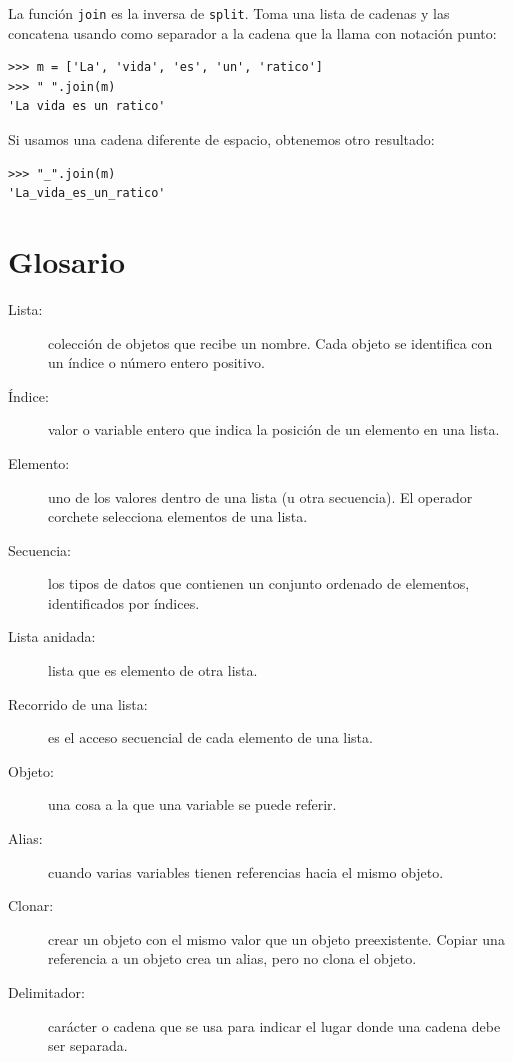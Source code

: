La función \texttt{join} es la inversa de \texttt{split}. Toma una
lista de cadenas y las concatena usando como separador a la cadena
que la llama con notación punto:
\begin{lstlisting}
>>> m = ['La', 'vida', 'es', 'un', 'ratico']
>>> " ".join(m)
'La vida es un ratico'
\end{lstlisting}
Si usamos una cadena diferente de espacio, obtenemos otro resultado:
\begin{lstlisting}
>>> "_".join(m)
'La_vida_es_un_ratico'
\end{lstlisting}
\section{Glosario}
\begin{description}
\item [{Lista:}] colección de objetos que recibe un nombre. Cada objeto
se identifica con un índice o número entero positivo.
\item [{Índice:}] valor o variable entero que indica la posición de un
elemento en una lista.
\item [{Elemento:}] uno de los valores dentro de una lista (u otra secuencia).
El operador corchete selecciona elementos de una lista.
\item [{Secuencia:}] los tipos de datos que contienen un conjunto ordenado
de elementos, identificados por índices.
\item [{Lista anidada:}] lista que es elemento de otra lista.
\item [{Recorrido de una lista:}] es el acceso secuencial de cada elemento
de una lista.
\item [{Objeto:}] una cosa a la que una variable se puede referir.
\item [{Alias:}] cuando varias variables tienen referencias hacia el mismo
objeto.
\item [{Clonar:}] crear un objeto con el mismo valor que un objeto preexistente.
Copiar una referencia a un objeto crea un alias, pero no clona el
objeto.
\item [{Delimitador:}] carácter o cadena que se usa para indicar el lugar
donde una cadena debe ser separada.

   
  
  
\end{description}

